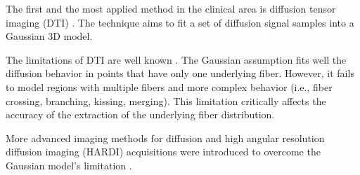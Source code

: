 \documentclass[twoside,twocolumn,10pt]{article}
\begin{document}
The first and the most applied method in the clinical area is diffusion tensor imaging (DTI) \cite{Basser1994}. The technique aims to fit a set of diffusion signal samples into a Gaussian 3D model.%

The limitations of DTI are well known \cite{descoteaux2015,SCHILLING2019194}. The Gaussian assumption fits well the diffusion behavior in points that have only one underlying fiber. However, it fails to model regions with multiple fibers and more complex behavior (i.e., fiber crossing, branching, kissing, merging). This limitation critically affects the accuracy of the extraction of the underlying fiber distribution.


More advanced imaging methods for diffusion and high angular resolution diffusion imaging (HARDI) acquisitions were introduced to overcome the Gaussian model's limitation \cite{descoteaux2015}. %

\end{document}

